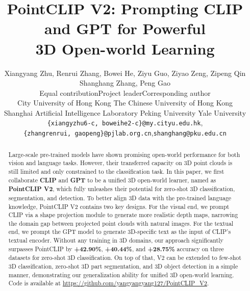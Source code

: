 \documentclass[10pt,twocolumn,letterpaper]{article}
\begin{document}
\title{PointCLIP V2: Prompting CLIP and GPT for Powerful\\3D Open-world Learning}

\author{Xiangyang Zhu, Renrui Zhang, Bowei He, Ziyu Guo, Ziyao Zeng, Zipeng Qin\\\vspace{0.2cm} Shanghang Zhang, Peng Gao\\
\normalsize{ Equal contribution}\quad   Project leader\quad   Corresponding author\vspace{0.3cm}\\
  City University of Hong Kong \quad \vspace{0.07cm}
  The Chinese University of Hong Kong\\
  Shanghai Artificial Intelligence Laboratory \quad
  Peking University\quad
  Yale University\vspace{0.2cm}\\
\texttt{\{xiangyzhu6-c, boweihe2-c\}@my.cityu.edu.hk},\\
\texttt{\{zhangrenrui, gaopeng\}@pjlab.org.cn},\quad \texttt{shanghang@pku.edu.cn}
}

\maketitle

\ificcvfinal\thispagestyle{empty}\fi

\begin{abstract}
Large-scale pre-trained models have shown promising open-world performance for both vision and language tasks. However, their transferred capacity on 3D point clouds is still limited and only constrained to the classification task. In this paper, we first collaborate \textbf{CLIP} and \textbf{GPT} to be a unified 3D open-world learner, named as \textbf{PointCLIP V2}, which fully unleashes their potential for zero-shot 3D classification, segmentation, and detection. To better align 3D data with the pre-trained language knowledge, PointCLIP V2 contains two key designs.
For the visual end, we prompt CLIP via a shape projection module to generate more realistic depth maps, narrowing the domain gap between projected point clouds with natural images. For the textual end, we prompt the GPT model to generate 3D-specific text as the input of CLIP's textual encoder. 
Without any training in 3D domains, our approach significantly surpasses PointCLIP by \textbf{+42.90\%}, \textbf{+40.44\%}, and \textbf{+28.75\%} accuracy on three datasets for zero-shot 3D classification.
On top of that, V2 can be extended to few-shot 3D classification, zero-shot 3D part segmentation, and 3D object detection in a simple manner, demonstrating our generalization ability for unified 3D open-world learning. 
Code is available at \url{https://github.com/yangyangyang127/PointCLIP_V2}.
\end{abstract}
\end{document}
